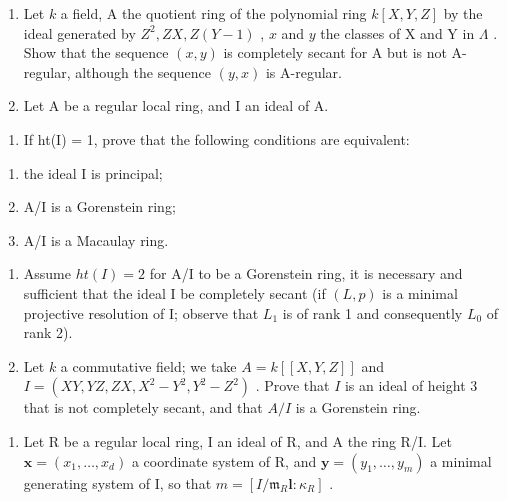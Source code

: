 
\begin{enumerate}
\def\labelenumi{\arabic{enumi})}
\item
  Let \(k\) a field, A the quotient ring of the polynomial ring \(k[X,Y,Z]\) by the ideal generated by \(Z^2,ZX,Z(Y-1)\) , \(x\) and \(y\) the classes of X and Y in \(\Lambda\) . Show that the sequence \((x,y)\) is completely secant for A but is not A-regular, although the sequence \((y,x)\) is A-regular.
\item
  Let A be a regular local ring, and I an ideal of A.
\end{enumerate}

\begin{enumerate}
\def\labelenumi{\alph{enumi})}
\tightlist
\item
  If ht(I) = 1, prove that the following conditions are equivalent:
\end{enumerate}

\begin{enumerate}
\def\labelenumi{(\roman{enumi})}
\item
  the ideal I is principal;
\item
  A/I is a Gorenstein ring;
\item
  A/I is a Macaulay ring.
\end{enumerate}

\begin{enumerate}
\def\labelenumi{\alph{enumi})}
\setcounter{enumi}{1}
\item
  Assume \(ht(I)=2\) for A/I to be a Gorenstein ring, it is necessary and sufficient that the ideal I be completely secant (if \((L,p)\) is a minimal projective resolution of I; observe that \(L_{1}\) is of rank 1 and consequently \(L_{0}\) of rank 2).
\item
  Let \(k\) a commutative field; we take \(A = k[[X,Y,Z]]\) and \(I = (XY,YZ,ZX, X^2 - Y^2, Y^2 - Z^2)\) . Prove that \(I\) is an ideal of height 3 that is not completely secant, and that \(A/I\) is a Gorenstein ring.
\end{enumerate}

\begin{enumerate}
\def\labelenumi{\arabic{enumi})}
\setcounter{enumi}{2}
\tightlist
\item
  Let R be a regular local ring, I an ideal of R, and A the ring R/I. Let \(\mathbf{x} = (x_{1}, \ldots, x_{d})\) a coordinate system of R, and \(\mathbf{y} = (y_{1}, \ldots, y_{m})\) a minimal generating system of I, so that \(m = [I/\mathfrak{m}_{R}\mathbf{l} : \kappa_{R}]\) .
\end{enumerate}

